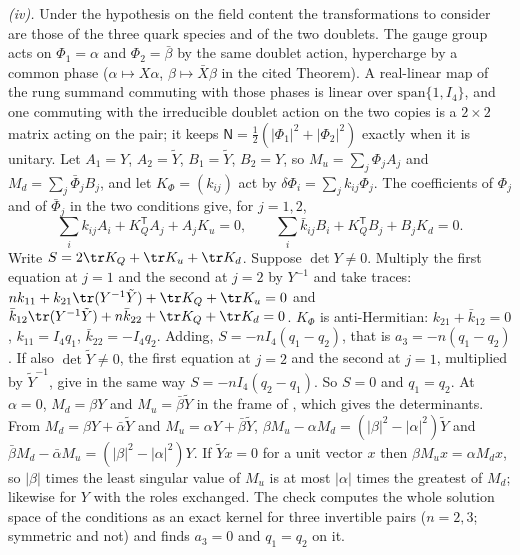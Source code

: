 \emph{(iv).} Under the hypothesis on the field content the transformations to consider are those of the three quark species and of the two doublets. The gauge group acts on $\Phi_{1} = \alpha$ and $\Phi_{2} = \bar\beta$ by the same doublet action, hypercharge by a common phase ($\alpha \mapsto X\alpha$, $\beta \mapsto \bar{X}\beta$ in the cited Theorem). A real-linear map of the rung summand commuting with those phases is linear over $\mathrm{span}\{1, I_{4}\}$, and one commuting with the irreducible doublet action on the two copies is a $2 \times 2$ matrix acting on the pair; it keeps $\mathsf{N} = \tfrac12(|\Phi_{1}|^{2} + |\Phi_{2}|^{2})$ exactly when it is unitary. Let $A_{1} = Y$, $A_{2} = \tilde{Y}$, $B_{1} = \tilde{Y}$, $B_{2} = Y$, so $M_{u} = \sum_{j}\Phi_{j}A_{j}$ and $M_{d} = \sum_{j}\bar\Phi_{j}B_{j}$, and let $K_{\Phi} = (k_{ij})$ act by $\delta\Phi_{i} = \sum_{j}k_{ij}\Phi_{j}$. The coefficients of $\Phi_{j}$ and of $\bar\Phi_{j}$ in the two conditions give, for $j = 1, 2$,
\[
\textstyle\sum_{i}k_{ij}A_{i} + K_{Q}^{\mathsf T}A_{j} + A_{j}K_{u} = 0, \qquad \sum_{i}\bar{k}_{ij}B_{i} + K_{Q}^{\mathsf T}B_{j} + B_{j}K_{d} = 0 .
\]
Write $S = 2\tr K_{Q} + \tr K_{u} + \tr K_{d}$. Suppose $\det Y \neq 0$. Multiply the first equation at $j = 1$ and the second at $j = 2$ by $Y^{-1}$ and take traces: $nk_{11} + k_{21}\tr(Y^{-1}\tilde{Y}) + \tr K_{Q} + \tr K_{u} = 0$ and $\bar{k}_{12}\tr(Y^{-1}\tilde{Y}) + n\bar{k}_{22} + \tr K_{Q} + \tr K_{d} = 0$. $K_{\Phi}$ is anti-Hermitian: $k_{21} + \bar{k}_{12} = 0$, $k_{11} = I_{4}q_{1}$, $\bar{k}_{22} = -I_{4}q_{2}$. Adding, $S = -nI_{4}(q_{1} - q_{2})$, that is $a_{3} = -n(q_{1} - q_{2})$. If also $\det\tilde{Y} \neq 0$, the first equation at $j = 2$ and the second at $j = 1$, multiplied by $\tilde{Y}^{-1}$, give in the same way $S = -nI_{4}(q_{2} - q_{1})$. So $S = 0$ and $q_{1} = q_{2}$. At $\alpha = 0$, $M_{d} = \beta Y$ and $M_{u} = \bar\beta\tilde{Y}$ in the frame of , which gives the determinants. From $M_{d} = \beta Y + \bar\alpha\tilde{Y}$ and $M_{u} = \alpha Y + \bar\beta\tilde{Y}$, $\beta M_{u} - \alpha M_{d} = (|\beta|^{2} - |\alpha|^{2})\tilde{Y}$ and $\bar\beta M_{d} - \bar\alpha M_{u} = (|\beta|^{2} - |\alpha|^{2})Y$. If $\tilde{Y}x = 0$ for a unit vector $x$ then $\beta M_{u}x = \alpha M_{d}x$, so $|\beta|$ times the least singular value of $M_{u}$ is at most $|\alpha|$ times the greatest of $M_{d}$; likewise for $Y$ with the roles exchanged. The check computes the whole solution space of the conditions as an exact kernel for three invertible pairs ($n = 2, 3$; symmetric and not) and finds $a_{3} = 0$ and $q_{1} = q_{2}$ on it.

